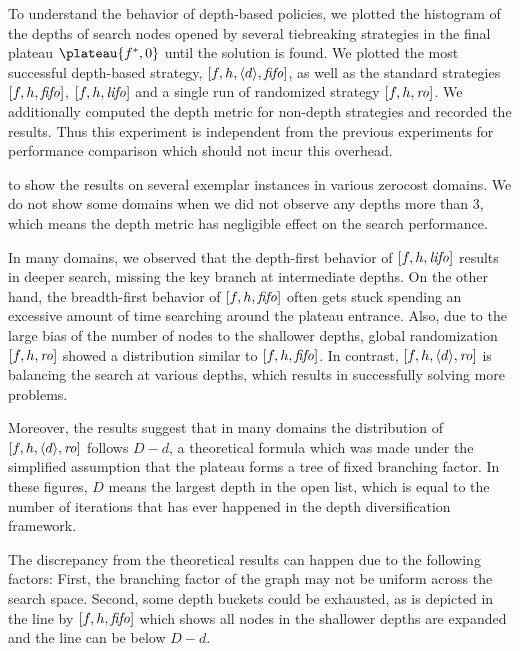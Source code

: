 To understand the behavior of depth-based policies, we plotted the
histogram of the depths of search nodes opened by several tiebreaking
strategies in the final plateau $\plateau{f^*,0}$ until the solution is
found.  We plotted the most successful depth-based strategy,
$[f,h,{\left<d\right>},{\text{\textit{fifo}}}]$, as well as the standard strategies $[f,h,{\text{\textit{fifo}}}]$,
$[f,h,{\text{\textit{lifo}}}]$ and a single run of randomized strategy $[f,h,{\text{\textit{ro}}}]$.
We additionally computed the depth metric for non-depth strategies and
recorded the results. Thus this experiment is independent from the
previous experiments for performance comparison which should not incur
this overhead.


 to  show the results on several exemplar instances in
various zerocost domains.  We do not show some domains when we did not observe any depths more than 3, which means
the depth metric has negligible effect on the search performance.

In many domains, we observed that the depth-first behavior of
$[f,h,{\text{\textit{lifo}}}]$ results in deeper search, missing the key branch at
intermediate depths.  On the other hand, the breadth-first behavior of
$[f,h,{\text{\textit{fifo}}}]$ often gets stuck spending an excessive amount of time
searching around the plateau entrance.  Also, due to the large bias of
the number of nodes to the shallower depths, global randomization
$[f,h,{\text{\textit{ro}}}]$ showed a distribution similar to $[f,h,{\text{\textit{fifo}}}]$.
In contrast, $[f,h,{\left<d\right>},{\text{\textit{ro}}}]$ is balancing the search at various depths, which
results in successfully solving more problems.

Moreover, the results suggest that in many domains the distribution of $[f,h,{\left<d\right>},{\text{\textit{ro}}}]$ follows
$D-d$, a theoretical formula which was made under the simplified
assumption that the plateau forms a tree of fixed branching factor. In these
figures, $D$ means the largest depth in the open list, which is equal to
the number of iterations that has ever happened in the depth diversification framework.

The discrepancy from the theoretical results can happen due to the
following factors: First, the branching factor of the graph may not be
uniform across the search space. Second, some depth buckets could be
exhausted, as is depicted in the line by $[f,h,{\text{\textit{fifo}}}]$ which
shows all nodes in the shallower depths are expanded and the line can be below $D-d$.

